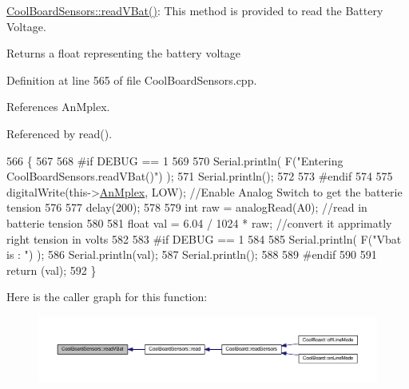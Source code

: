 \hyperlink{classCoolBoardSensors_a6944b6ea7bce8e2fce1b434acfd9d5f3}{Cool\+Board\+Sensors\+::read\+V\+Bat()}\+: This method is provided to read the Battery Voltage.

\begin{DoxyReturn}{Returns}
a float representing the battery voltage 
\end{DoxyReturn}


Definition at line 565 of file Cool\+Board\+Sensors.\+cpp.



References An\+Mplex.



Referenced by read().


\begin{DoxyCode}
566 \{
567 
568 \textcolor{preprocessor}{#if DEBUG == 1}
569 
570     Serial.println( F(\textcolor{stringliteral}{"Entering CoolBoardSensors.readVBat()"}) );
571     Serial.println();
572 
573 \textcolor{preprocessor}{#endif}
574 
575     digitalWrite(this->\hyperlink{classCoolBoardSensors_a12ef28b1046219e0aee10bf64e28c4a5}{AnMplex}, LOW);                            \textcolor{comment}{//Enable Analog Switch to get the
       batterie tension}
576     
577     delay(200);
578     
579     \textcolor{keywordtype}{int} raw = analogRead(A0);                                    \textcolor{comment}{//read in batterie tension}
580     
581     \textcolor{keywordtype}{float} val = 6.04 / 1024 * raw;                               \textcolor{comment}{//convert it apprimatly right tension in
       volts}
582     
583 \textcolor{preprocessor}{#if DEBUG == 1}
584 
585     Serial.println( F(\textcolor{stringliteral}{"Vbat is : "}) );
586     Serial.println(val);
587     Serial.println();
588 
589 \textcolor{preprocessor}{#endif}
590 
591     \textcolor{keywordflow}{return} (val);   
592 \}
\end{DoxyCode}
Here is the caller graph for this function\+:
\nopagebreak
\begin{figure}[H]
\begin{center}
\leavevmode
\includegraphics[width=350pt]{classCoolBoardSensors_a6944b6ea7bce8e2fce1b434acfd9d5f3_icgraph}
\end{center}
\end{figure}
\mbox{\label{classCoolBoardSensors_a406307ffd70272282d91479c7ed8d66f}} 
